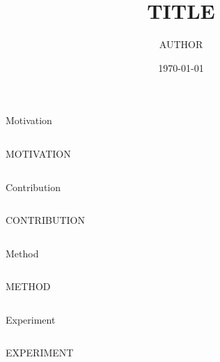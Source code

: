 \documentclass{beamer}
\title{TITLE}
\author{AUTHOR}
\date{\today}
\begin{document}
\begin{frame}
\titlepage
\end{frame}

\begin{frame}{Motivation}
\begin{columns}
    \begin{column}{.5\linewidth}
        \begin{itemize}
            MOTIVATION
        \end{itemize}
    \end{column}
\end{columns}
\end{frame}

\begin{frame}{Contribution}
\begin{columns}
    \begin{column}{.5\linewidth}
        \begin{itemize}
            CONTRIBUTION
        \end{itemize}
    \end{column}
\end{columns}
\end{frame}

\begin{frame}{Method}
\begin{columns}
    \begin{column}{.5\linewidth}
        \begin{itemize}
            METHOD
        \end{itemize}
    \end{column}
\end{columns}
\end{frame}

\begin{frame}{Experiment}
\begin{columns}
    \begin{column}{.5\linewidth}
        \begin{itemize}
            EXPERIMENT
        \end{itemize}
    \end{column}
\end{columns}
\end{frame}
\end{document}
